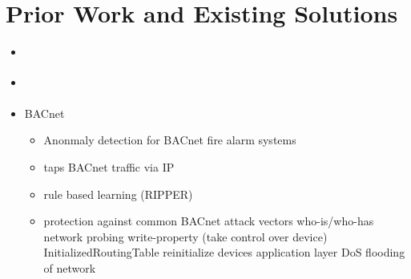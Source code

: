 \section{Prior Work and Existing Solutions }

\begin{itemize}
	\item \parencite{Yang2006}
	\item \parencite{Celeda2012}
	\item \textcite{Pan2014} BACnet
		\begin{itemize}
			\item Anonmaly detection for BACnet fire alarm systems
			\item taps BACnet traffic via IP
			\item rule based learning (RIPPER)
			\item protection against common BACnet attack vectors
				\subitem who-is/who-has network probing
				\subitem write-property (take control over device)
				\subitem InitializedRoutingTable
				\subitem reinitialize devices
				\subitem application layer DoS
				\subitem flooding of network
		\end{itemize}
\end{itemize}